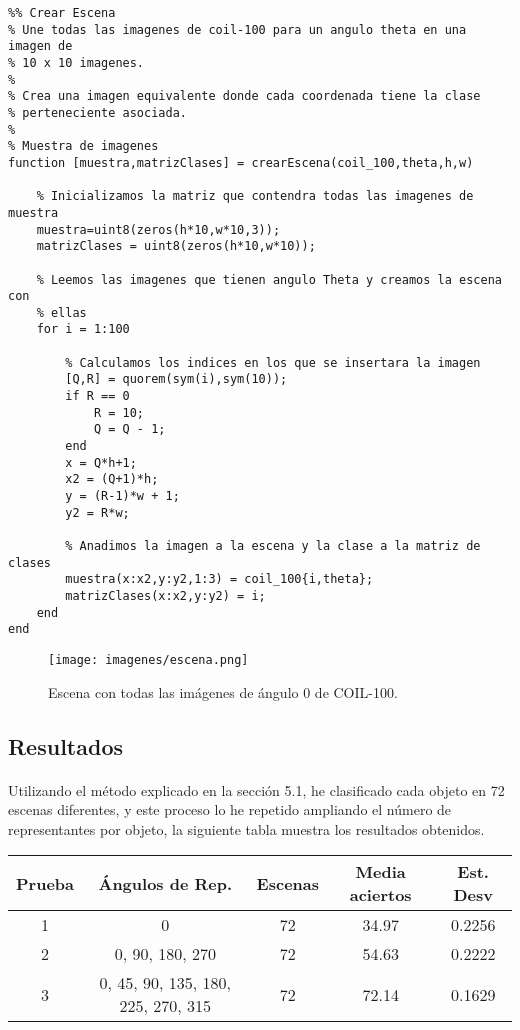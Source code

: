 \documentclass[es,gi]{ifirak}\usepackage[]{graphicx}\usepackage[]{color}
\begin{document}
\begin{lstlisting}
%% Crear Escena
% Une todas las imagenes de coil-100 para un angulo theta en una imagen de
% 10 x 10 imagenes.
%
% Crea una imagen equivalente donde cada coordenada tiene la clase
% perteneciente asociada.
%
% Muestra de imagenes 
function [muestra,matrizClases] = crearEscena(coil_100,theta,h,w)

    % Inicializamos la matriz que contendra todas las imagenes de muestra
    muestra=uint8(zeros(h*10,w*10,3));
    matrizClases = uint8(zeros(h*10,w*10));
    
    % Leemos las imagenes que tienen angulo Theta y creamos la escena con
    % ellas
    for i = 1:100
        
        % Calculamos los indices en los que se insertara la imagen
        [Q,R] = quorem(sym(i),sym(10));
        if R == 0
            R = 10;
            Q = Q - 1;
        end
        x = Q*h+1;
        x2 = (Q+1)*h;
        y = (R-1)*w + 1;
        y2 = R*w;
        
        % Anadimos la imagen a la escena y la clase a la matriz de clases
        muestra(x:x2,y:y2,1:3) = coil_100{i,theta};
        matrizClases(x:x2,y:y2) = i;
    end
end
\end{lstlisting}

\begin{figure}[hbtp]
\centering
\texttt{[image: imagenes/escena.png]}
\caption{Escena con todas las imágenes de ángulo 0 de COIL-100.}
\end{figure}

\pagebreak
\subsection{Resultados}
\paragraph{} Utilizando el método explicado en la sección 5.1, he clasificado cada objeto en 72 escenas diferentes, y este proceso lo he repetido ampliando el número de representantes por objeto, la siguiente tabla muestra los resultados obtenidos.\\

\begin{tabular}{ccccc}
 \toprule
	\bfseries Prueba &
	\bfseries Ángulos de Rep.&
	\bfseries Escenas &
	\bfseries Media aciertos &
	\bfseries Est. Desv\\
 \midrule
	1 & 0 & 72 & 34.97 & 0.2256\\
	2 & 0, 90, 180, 270 & 72 & 54.63 &  0.2222\\
	3 & 0, 45, 90, 135, 180, 225, 270, 315 & 72 & 72.14 &  0.1629\\
 \bottomrule
\end{tabular}
\end{document}
